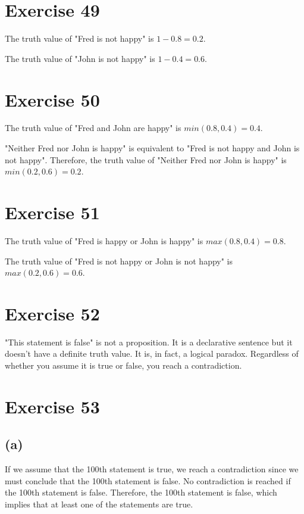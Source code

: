 \documentclass{article}
\begin{document}
\pagebreak

\section{Exercise 49}
The truth value of "Fred is not happy" is $1 - 0.8 = 0.2$.

The truth value of "John is not happy" is $1 - 0.4 = 0.6$.

\pagebreak

\section{Exercise 50}
The truth value of "Fred and John are happy" is $min(0.8, 0.4) = 0.4$.

"Neither Fred nor John is happy" is equivalent to "Fred is not happy and John is not happy". Therefore, the truth value of "Neither Fred nor John is happy" is $min(0.2, 0.6) = 0.2$.

\pagebreak

\section{Exercise 51}
The truth value of "Fred is happy or John is happy" is $max(0.8, 0.4) = 0.8$.

The truth value of "Fred is not happy or John is not happy" is $max(0.2, 0.6) = 0.6$.

\pagebreak

\section{Exercise 52}
"This statement is false" is not a proposition.  It is a declarative sentence but it doesn't have a definite truth value.  It is, in fact, a logical paradox. Regardless of whether you assume it is true or false, you reach a contradiction.

\pagebreak

\section{Exercise 53}
\subsection{(a)}
If we assume that the 100th statement is true, we reach a contradiction since we must conclude that the 100th statement is false. No contradiction is reached if the 100th statement is false. Therefore, the 100th statement is false, which implies that at least one of the statements are true.
\end{document}
